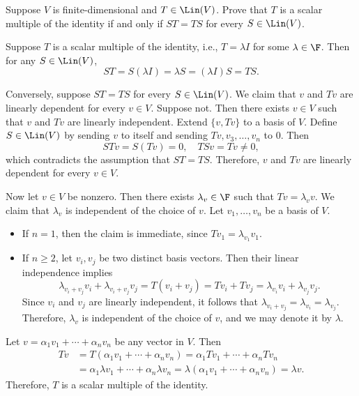 \begin{exc}
\begin{exercise}
Suppose $V$ is finite-dimensional and $T\in\Lin(V)$. Prove that $T$ is a
scalar multiple of the identity if and only if $ST=TS$ for every
$S\in\Lin(V)$.
\end{exercise}
\begin{solution}
Suppose $T$ is a scalar multiple of the identity, i.e., $T=\lambda I$ for some
$\lambda\in\F$. Then for any $S\in\Lin(V)$,
\[ ST=S(\lambda I)=\lambda S=(\lambda I)S=TS. \]

Conversely, suppose $ST=TS$ for every $S\in\Lin(V)$. We claim that $v$ and
$Tv$ are linearly dependent for every $v\in V$. Suppose not. Then there exists
$v\in V$ such that $v$ and $Tv$ are linearly independent. Extend $\{v,Tv\}$ to
a basis of $V$. Define $S\in\Lin(V)$ by sending $v$ to itself and sending
$Tv,v_3,\dots,v_n$ to $0$. Then
\[ STv=S(Tv)=0, \quad TSv=Tv\ne0, \]
which contradicts the assumption that $ST=TS$. Therefore, $v$ and $Tv$ are
linearly dependent for every $v\in V$.

Now let $v\in V$ be nonzero. Then there exists $\lambda_v\in\F$ such that
$Tv=\lambda_vv$. We claim that $\lambda_v$ is independent of the choice of
$v$. Let $v_1,\dots,v_n$ be a basis of $V$.
\begin{itemize}
\item If $n=1$, then the claim is immediate, since $Tv_1=\lambda_{v_1}v_1$.
\item If $n\ge2$, let $v_i,v_j$ be two distinct basis vectors. Then their
  linear independence implies
  \[ \lambda_{v_i+v_j}v_i+\lambda_{v_i+v_j}v_j=T(v_i+v_j)=Tv_i+Tv_j
     =\lambda_{v_i}v_i+\lambda_{v_j}v_j. \]
  Since $v_i$ and $v_j$ are linearly independent, it follows that
  $\lambda_{v_i+v_j}=\lambda_{v_i}=\lambda_{v_j}$. Therefore, $\lambda_v$ is
  independent of the choice of $v$, and we may denote it by $\lambda$.
\end{itemize}
Let $v=\alpha_1v_1+\cdots+\alpha_nv_n$ be any vector in $V$. Then
\begin{align*}
Tv &= T(\alpha_1v_1+\cdots+\alpha_nv_n)=\alpha_1Tv_1+\cdots+\alpha_nTv_n\\
   &= \alpha_1\lambda v_1+\cdots+\alpha_n\lambda v_n
    =\lambda(\alpha_1v_1+\cdots+\alpha_nv_n)=\lambda v.
\end{align*}
Therefore, $T$ is a scalar multiple of the identity.
\end{solution}


\end{exc}
